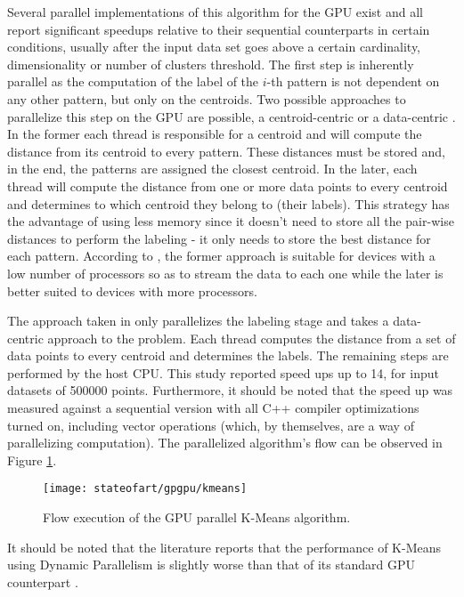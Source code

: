 Several parallel implementations of this algorithm for the GPU exist \cite{Bai2009, Wu2011, Zechner2009, Sirotkovi2012, Farivar2008} and all report significant speedups relative to their sequential counterparts in certain conditions, usually after the input data set goes above a certain cardinality, dimensionality or number of clusters threshold.
The first step is inherently parallel as the computation of the label of the $i$-th pattern is not dependent on any other pattern, but only on the centroids.
Two possible approaches to parallelize this step on the GPU are possible, a centroid-centric or a data-centric \cite{Bai2009}.
In the former each thread is responsible for a centroid and will compute the distance from its centroid to every pattern.
These distances must be stored and, in the end, the patterns are assigned the closest centroid.
In the later, each thread will compute the distance from one or more data points to every centroid and determines to which centroid they belong to (their labels).
This strategy has the advantage of using less memory since it doesn't need to store all the pair-wise distances to perform the labeling - it only needs to store the best distance for each pattern.
According to \cite{Bai2009}, the former approach is suitable for devices with a low number of processors so as to stream the data to each one while the later is better suited to devices with more processors.

The approach taken in \cite{Zechner2009b} only parallelizes the labeling stage and takes a data-centric approach to the problem.
Each thread computes the distance from a set of data points to every centroid and determines the labels.
The remaining steps are performed by the host CPU.
This study reported speed ups up to 14, for input datasets of 500000 points.
Furthermore, it should be noted that the speed up was measured against a sequential version with all C++ compiler optimizations turned on, including vector operations (which, by themselves, are a way of parallelizing computation).
The parallelized algorithm's flow can be observed in Figure \ref{fig:kmeans}.

\begin{figure}[hbtp]
	\centering
	\texttt{[image: stateofart/gpgpu/kmeans]}
	\caption{Flow execution of the GPU parallel K-Means algorithm.}
	\label{fig:kmeans}
\end{figure}

It should be noted that the literature reports that the performance of K-Means using Dynamic Parallelism is slightly worse than that of its standard GPU counterpart \cite{DiMarco2013}.

